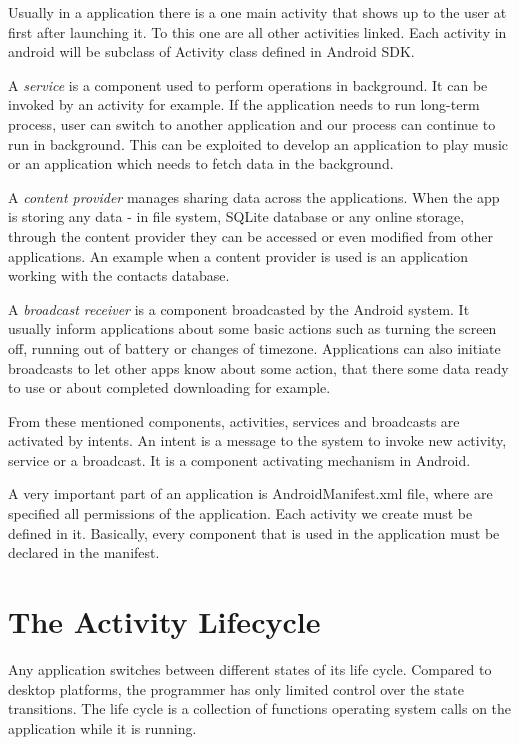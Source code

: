 Usually in a application there is a one main activity that shows up to the user at first after launching it.
To this one are all other activities linked.
Each activity in android will be subclass of Activity class defined in Android SDK.

A \emph{service} is a component used to perform operations in background.
It can be invoked by an activity for example.
If the application needs to run long-term process, user can switch to another application and our process can continue to run in background.
This can be exploited to develop an application to play music or an application which needs to fetch data in the background.

A \emph{content provider} manages sharing data across the applications.
When the app is storing any data - in file system, SQLite database or any online storage, through the content provider they can be accessed or even modified from other applications.
An example when a content provider is used is an application working with the contacts database.

A \emph{broadcast receiver} is a component broadcasted by the Android system.
It usually inform applications about some basic actions such as turning the screen off, running out of battery or changes of timezone.
Applications can also initiate broadcasts to let other apps know about some action, that there some data ready to use or about completed downloading for example.

From these mentioned components, activities, services and broadcasts are activated by intents.
An intent is a message to the system to invoke new activity, service or a broadcast.
It is a component activating mechanism in Android.

A very important part of an application is AndroidManifest\@.xml file, where are specified all permissions of the application.
Each activity we create must be defined in it. Basically, every component that is used in the application must be declared in the manifest.


\section{The Activity Lifecycle}
\label{sec:lifecycle}

Any application switches between different states of its life cycle. 
Compared to desktop platforms, the programmer has only limited control over the state transitions.
The life cycle is a collection of functions operating system calls on the application while it is running.

